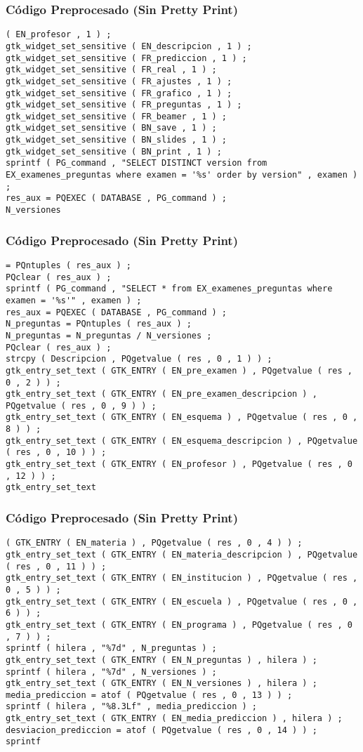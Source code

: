\documentclass{beamer}
\begin{document}
\begin{frame}[fragile]
\frametitle{C\'odigo Preprocesado (Sin Pretty Print)}
\begin{lstlisting}[style=CStyle]
( EN_profesor , 1 ) ; 
gtk_widget_set_sensitive ( EN_descripcion , 1 ) ; 
gtk_widget_set_sensitive ( FR_prediccion , 1 ) ; 
gtk_widget_set_sensitive ( FR_real , 1 ) ; 
gtk_widget_set_sensitive ( FR_ajustes , 1 ) ; 
gtk_widget_set_sensitive ( FR_grafico , 1 ) ; 
gtk_widget_set_sensitive ( FR_preguntas , 1 ) ; 
gtk_widget_set_sensitive ( FR_beamer , 1 ) ; 
gtk_widget_set_sensitive ( BN_save , 1 ) ; 
gtk_widget_set_sensitive ( BN_slides , 1 ) ; 
gtk_widget_set_sensitive ( BN_print , 1 ) ; 
sprintf ( PG_command , "SELECT DISTINCT version from EX_examenes_preguntas where examen = '%s' order by version" , examen ) ; 
res_aux = PQEXEC ( DATABASE , PG_command ) ; 
N_versiones \end{lstlisting}
\end{frame}
\begin{frame}[fragile]
\frametitle{C\'odigo Preprocesado (Sin Pretty Print)}
\begin{lstlisting}[style=CStyle]
= PQntuples ( res_aux ) ; 
PQclear ( res_aux ) ; 
sprintf ( PG_command , "SELECT * from EX_examenes_preguntas where examen = '%s'" , examen ) ; 
res_aux = PQEXEC ( DATABASE , PG_command ) ; 
N_preguntas = PQntuples ( res_aux ) ; 
N_preguntas = N_preguntas / N_versiones ; 
PQclear ( res_aux ) ; 
strcpy ( Descripcion , PQgetvalue ( res , 0 , 1 ) ) ; 
gtk_entry_set_text ( GTK_ENTRY ( EN_pre_examen ) , PQgetvalue ( res , 0 , 2 ) ) ; 
gtk_entry_set_text ( GTK_ENTRY ( EN_pre_examen_descripcion ) , PQgetvalue ( res , 0 , 9 ) ) ; 
gtk_entry_set_text ( GTK_ENTRY ( EN_esquema ) , PQgetvalue ( res , 0 , 8 ) ) ; 
gtk_entry_set_text ( GTK_ENTRY ( EN_esquema_descripcion ) , PQgetvalue ( res , 0 , 10 ) ) ; 
gtk_entry_set_text ( GTK_ENTRY ( EN_profesor ) , PQgetvalue ( res , 0 , 12 ) ) ; 
gtk_entry_set_text \end{lstlisting}
\end{frame}
\begin{frame}[fragile]
\frametitle{C\'odigo Preprocesado (Sin Pretty Print)}
\begin{lstlisting}[style=CStyle]
( GTK_ENTRY ( EN_materia ) , PQgetvalue ( res , 0 , 4 ) ) ; 
gtk_entry_set_text ( GTK_ENTRY ( EN_materia_descripcion ) , PQgetvalue ( res , 0 , 11 ) ) ; 
gtk_entry_set_text ( GTK_ENTRY ( EN_institucion ) , PQgetvalue ( res , 0 , 5 ) ) ; 
gtk_entry_set_text ( GTK_ENTRY ( EN_escuela ) , PQgetvalue ( res , 0 , 6 ) ) ; 
gtk_entry_set_text ( GTK_ENTRY ( EN_programa ) , PQgetvalue ( res , 0 , 7 ) ) ; 
sprintf ( hilera , "%7d" , N_preguntas ) ; 
gtk_entry_set_text ( GTK_ENTRY ( EN_N_preguntas ) , hilera ) ; 
sprintf ( hilera , "%7d" , N_versiones ) ; 
gtk_entry_set_text ( GTK_ENTRY ( EN_N_versiones ) , hilera ) ; 
media_prediccion = atof ( PQgetvalue ( res , 0 , 13 ) ) ; 
sprintf ( hilera , "%8.3Lf" , media_prediccion ) ; 
gtk_entry_set_text ( GTK_ENTRY ( EN_media_prediccion ) , hilera ) ; 
desviacion_prediccion = atof ( PQgetvalue ( res , 0 , 14 ) ) ; 
sprintf \end{lstlisting}
\end{frame}
\end{document}
